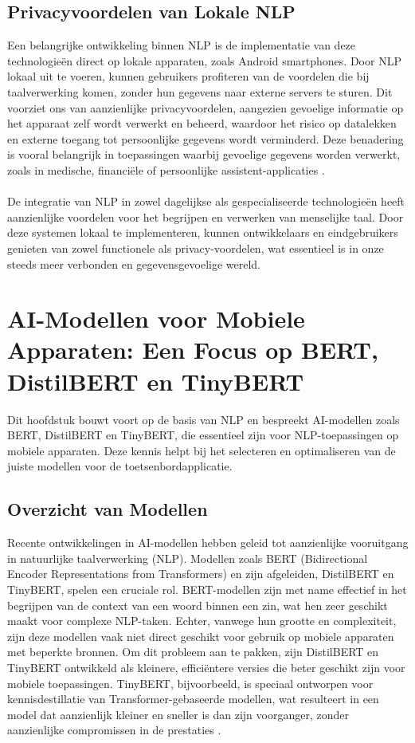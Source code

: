 \subsection{Privacyvoordelen van Lokale NLP}

Een belangrijke ontwikkeling binnen NLP is de implementatie van deze technologieën direct op lokale apparaten, zoals Android smartphones. Door NLP lokaal uit te voeren, kunnen gebruikers profiteren van de voordelen die bij taalverwerking komen, zonder hun gegevens naar externe servers te sturen. Dit voorziet ons van aanzienlijke privacyvoordelen, aangezien gevoelige informatie op het apparaat zelf wordt verwerkt en beheerd, waardoor het risico op datalekken en externe toegang tot persoonlijke gegevens wordt verminderd. Deze benadering is vooral belangrijk in toepassingen waarbij gevoelige gegevens worden verwerkt, zoals in medische, financiële of persoonlijke assistent-applicaties \autocite{Locke2021Natural}.
\\ \\
De integratie van NLP in zowel dagelijkse als gespecialiseerde technologieën heeft aanzienlijke voordelen voor het begrijpen en verwerken van menselijke taal. Door deze systemen lokaal te implementeren, kunnen ontwikkelaars en eindgebruikers genieten van zowel functionele als privacy-voordelen, wat essentieel is in onze s\-t\-ee\-ds meer verbonden en gegevensgevoelige wereld.

\section{AI-Modellen voor Mobiele Apparaten: Een Focus op BERT, DistilBERT en TinyBERT}

Dit hoofdstuk bouwt voort op de basis van NLP en bespreekt AI-modellen zoals BERT, DistilBERT en TinyBERT, die essentieel zijn voor NLP-toepassingen op mobiele apparaten. Deze kennis helpt bij het selecteren en optimaliseren van de juiste modellen voor de toetsenbordapplicatie.

\subsection{Overzicht van Modellen}

Recente ontwikkelingen in AI-modellen hebben geleid tot aanzienlijke vooruitgang in natuurlijke taalverwerking (NLP). Modellen zoals BERT (Bidirectional Encoder Representations from Transformers) en zijn afgeleiden, DistilBERT en TinyBERT, spelen een cruciale rol. BERT-modellen zijn met name effectief in het begrijpen van de context van een woord binnen een zin, wat hen zeer geschikt maakt voor complexe NLP-taken. Echter, vanwege hun grootte en complexiteit, zijn deze modellen vaak niet direct geschikt voor gebruik op mobiele apparaten met beperkte bronnen. Om dit probleem aan te pakken, zijn DistilBERT en TinyBERT ontwikkeld als kleinere, efficiëntere versies die beter geschikt zijn voor mobiele toepassingen. TinyBERT, bijvoorbeeld, is speciaal ontworpen voor kennisdestillatie van Transformer-gebaseerde modellen, wat resulteert in een model dat aanzienlijk kleiner en sneller is dan zijn voorganger, zonder aanzienlijke compromissen in de prestaties \autocite{Jiao2019TinyBERT}.

